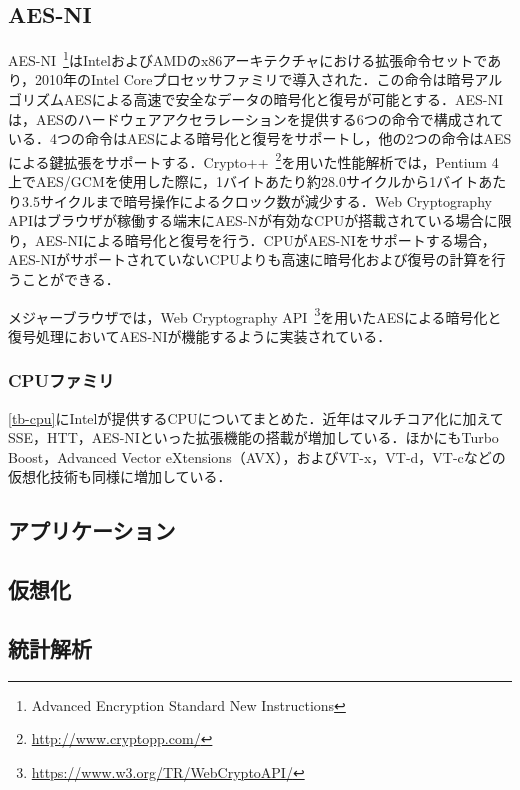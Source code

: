 \subsection{AES-NI}
AES-NI~\footnote{Advanced Encryption Standard New Instructions}はIntelおよびAMDのx86アーキテクチャにおける拡張命令セットであり，2010年のIntel Coreプロセッサファミリで導入された．この命令は暗号アルゴリズムAESによる高速で安全なデータの暗号化と復号が可能とする．AES-NIは，AESのハードウェアアクセラレーションを提供する6つの命令で構成されている．4つの命令はAESによる暗号化と復号をサポートし，他の2つの命令はAESによる鍵拡張をサポートする．Crypto++~\footnote{\url{http://www.cryptopp.com/}}を用いた性能解析では，Pentium 4上でAES/GCMを使用した際に，1バイトあたり約28.0サイクルから1バイトあたり3.5サイクルまで暗号操作によるクロック数が減少する．Web Cryptography APIはブラウザが稼働する端末にAES-Nが有効なCPUが搭載されている場合に限り，AES-NIによる暗号化と復号を行う．CPUがAES-NIをサポートする場合，AES-NIがサポートされていないCPUよりも高速に暗号化および復号の計算を行うことができる．

メジャーブラウザでは，Web Cryptography API~\footnote{\url{https://www.w3.org/TR/WebCryptoAPI/}}を用いたAESによる暗号化と復号処理においてAES-NIが機能するように実装されている．
\subsubsection{CPUファミリ}
\ref{tb-cpu}にIntelが提供するCPUについてまとめた．近年はマルチコア化に加えてSSE，HTT，AES-NIといった拡張機能の搭載が増加している．ほかにもTurbo Boost，Advanced Vector eXtensions（AVX），およびVT-x，VT-d，VT-cなどの仮想化技術も同様に増加している．
\subsection{アプリケーション}
\subsection{仮想化}
\subsection{統計解析}

